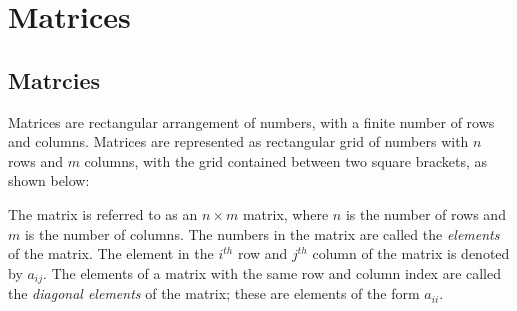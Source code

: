 \chapter{Matrices}\label{chp:vectors}


\section{Matrcies}
Matrices are rectangular arrangement of numbers, with a finite number of rows and columns. Matrices are represented as rectangular grid of numbers with $n$ rows and $m$ columns, with the grid contained between two square brackets, as shown below:
\begin{center}
\hspace{0.5cm}
\end{center}
The matrix is referred to as an $n \times m$ matrix, where $n$ is the number of rows and $m$ is the number of columns. The numbers in the matrix are called the \textit{elements} of the matrix. The element in the $i^{th}$ row and $j^{th}$ column of the matrix is denoted by $a_{ij}$. The elements of a matrix with the same row and column index are called the \textit{diagonal elements} of the matrix; these are elements of the form $a_{ii}$.

